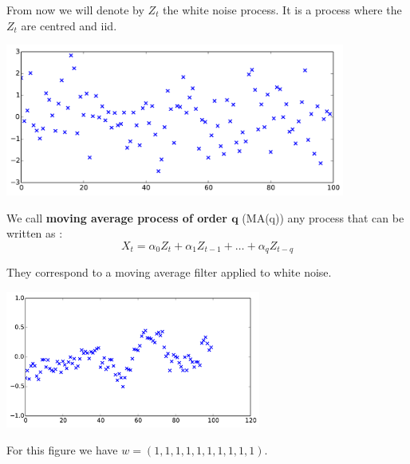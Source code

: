 \documentclass{beamer}
\begin{document}
\begin{frame}{}
From now we will denote by $Z_t$ the white noise process. It is a process where the $Z_t$ are centred and iid.\\
\vspace{5mm}
\begin{center}
\includegraphics[height=5cm]{figures/1_whitenoise}
\end{center}
\end{frame}

\begin{frame}{}
\begin{definition}
We call \textbf{moving average process of order $\mathbf{q}$} (MA(q)) any process that can be written as :
\begin{equation*}
X_t  = \alpha_0 Z_{t} + \alpha_1 Z_{t-1} + \dots + \alpha_q Z_{t-q}
\end{equation*}
\end{definition}
They correspond to a moving average filter applied to white noise.
\begin{center}
\includegraphics[height=4.5cm]{figures/1_ma}
\end{center}
For this figure we have $w=(1,1,1,1,1,1,1,1,1,1)$.
\end{frame}
\end{document}
